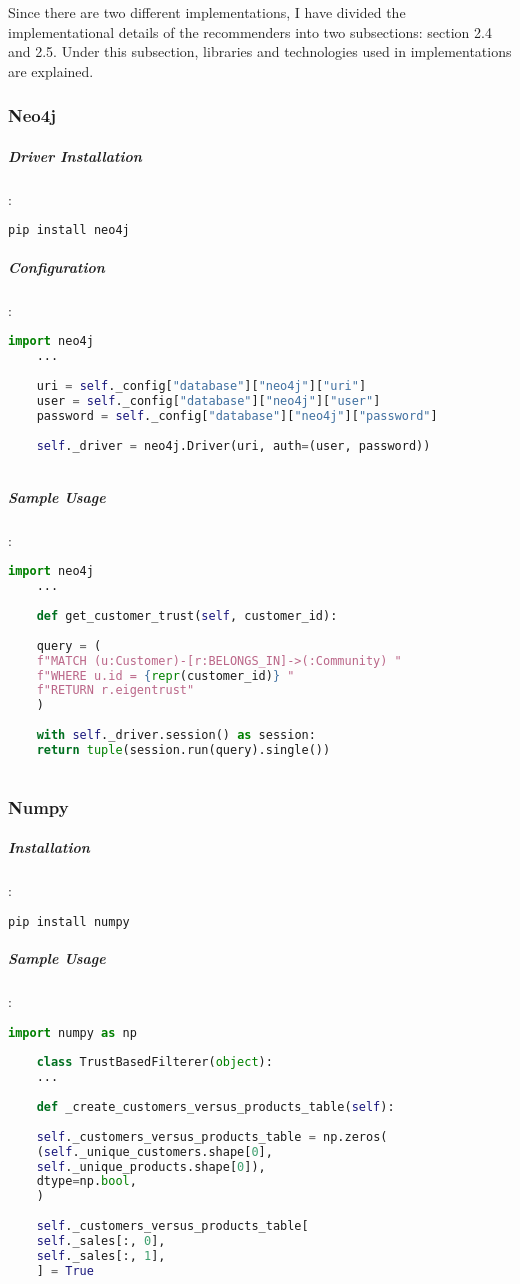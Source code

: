 	Since there are two different implementations, I have divided the implementational details of the recommenders into two subsections: section 2.4 and 2.5. Under this subsection, libraries and technologies used in implementations are explained.
	\subsubsection{Neo4j}
	\subparagraph{Driver Installation}:
	\begin{lstlisting}[language=bash]
	pip install neo4j
	\end{lstlisting}
	
	\subparagraph{Configuration}:
	\begin{lstlisting}[language=python]
	import neo4j
	...
	
	uri = self._config["database"]["neo4j"]["uri"]
	user = self._config["database"]["neo4j"]["user"]
	password = self._config["database"]["neo4j"]["password"]
	
	self._driver = neo4j.Driver(uri, auth=(user, password))
	
	\end{lstlisting}
	
	\subparagraph{Sample Usage}:
	\begin{lstlisting}[language=python, caption=Neo4j driver example]
	import neo4j
	...
	
	def get_customer_trust(self, customer_id):
	
	query = (
	f"MATCH (u:Customer)-[r:BELONGS_IN]->(:Community) "
	f"WHERE u.id = {repr(customer_id)} "
	f"RETURN r.eigentrust"
	)
	
	with self._driver.session() as session:
	return tuple(session.run(query).single())
	
	\end{lstlisting}
	
	\subsubsection{Numpy}
	\subparagraph{Installation}:
	\begin{lstlisting}[language=bash]
	pip install numpy
	\end{lstlisting}
	
	\subparagraph{Sample Usage}:
	\begin{lstlisting}[language=python, caption=Numpy example]
	import numpy as np
	
	class TrustBasedFilterer(object):
	...
	
	def _create_customers_versus_products_table(self):
	
	self._customers_versus_products_table = np.zeros(
	(self._unique_customers.shape[0],
	self._unique_products.shape[0]),
	dtype=np.bool,
	)
	
	self._customers_versus_products_table[
	self._sales[:, 0],
	self._sales[:, 1],
	] = True
	\end{lstlisting}
	
